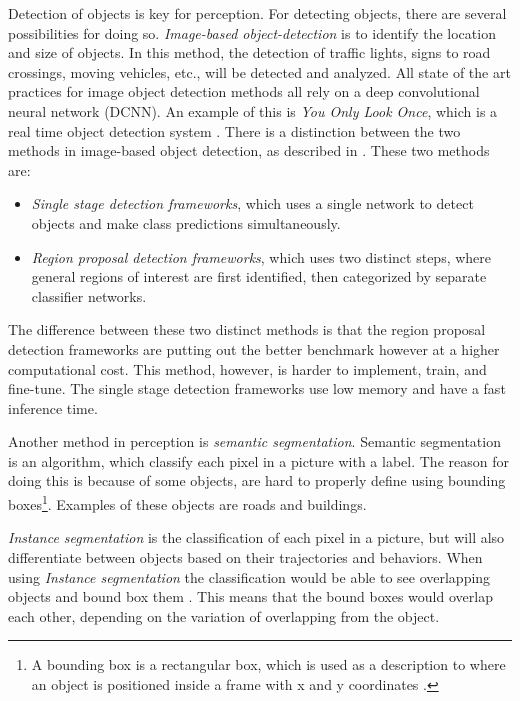 Detection of objects is key for perception.
For detecting objects, there are several possibilities for doing so.
\textit{Image-based object-detection} is to identify the location and size of objects.
In this method, the detection of traffic lights, signs to road crossings, moving vehicles, etc., will be detected and analyzed.
All state of the art practices for image object detection methods all rely on a deep convolutional neural network (DCNN).
An example of this is \textit{You Only Look Once}, which is a real time object detection system \cite{objectDetection_yolo:_02-10}.
There is a distinction between the two methods in image-based object detection, as described in \cite{yurtsever_survey_2019}.
These two methods are:

\begin{itemize}
    \item \textit{Single stage detection frameworks}, which uses a single network to detect objects and make class predictions simultaneously.
    \item \textit{Region proposal detection frameworks}, which uses two distinct steps, where general regions of interest are first identified, then categorized by separate classifier networks.
\end{itemize}

The difference between these two distinct methods is that the region proposal detection frameworks are putting out the better benchmark however at a higher computational cost.
This method, however, is harder to implement, train, and fine-tune.
The single stage detection frameworks use low memory and have a fast inference time.

Another method in perception is \textit{semantic segmentation}.
Semantic segmentation is an algorithm, which classify each pixel in a picture with a label.
The reason for doing this is because of some objects, are hard to properly define using bounding boxes\footnote{A bounding box is a rectangular box, which is used as a description to where an object is positioned inside a frame with x and y coordinates \cite{d2l_12-3-_10-10}.}.
Examples of these objects are roads and buildings.

\textit{Instance segmentation} is the classification of each pixel in a picture, but will also differentiate between objects based on their trajectories and behaviors.
When using \textit{Instance segmentation} the classification would be able to see overlapping objects and bound box them \cite{mittal_instance_2019}.
This means that the bound boxes would overlap each other, depending on the variation of overlapping from the object.

